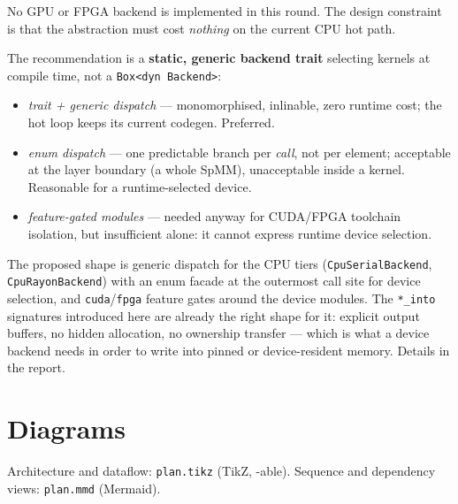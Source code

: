 \documentclass[11pt,a4paper]{article}
\begin{document}
No GPU or FPGA backend is implemented in this round. The design constraint
is that the abstraction must cost \emph{nothing} on the current CPU hot path.

The recommendation is a \textbf{static, generic backend trait} selecting
kernels at compile time, not a \texttt{Box<dyn Backend>}:

\begin{itemize}
  \item \emph{trait + generic dispatch} --- monomorphised, inlinable, zero
    runtime cost; the hot loop keeps its current codegen. Preferred.
  \item \emph{enum dispatch} --- one predictable branch per \emph{call}, not
    per element; acceptable at the layer boundary (a whole SpMM), unacceptable
    inside a kernel. Reasonable for a runtime-selected device.
  \item \emph{feature-gated modules} --- needed anyway for CUDA/FPGA toolchain
    isolation, but insufficient alone: it cannot express runtime device
    selection.
\end{itemize}

The proposed shape is generic dispatch for the CPU tiers
(\texttt{CpuSerialBackend}, \texttt{CpuRayonBackend}) with an enum facade at
the outermost call site for device selection, and \texttt{cuda}/\texttt{fpga}
feature gates around the device modules. The \texttt{*\_into} signatures
introduced here are already the right shape for it: explicit output buffers,
no hidden allocation, no ownership transfer --- which is what a device
backend needs in order to write into pinned or device-resident memory.
Details in the report.

\section{Diagrams}

Architecture and dataflow: \texttt{plan.tikz} (TikZ, \verb||-able).
Sequence and dependency views: \texttt{plan.mmd} (Mermaid).


\end{document}
